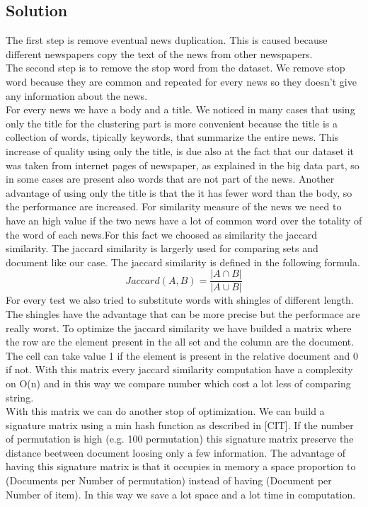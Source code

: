 \documentclass{acm_proc_article-sp}
\begin{document}
\subsection{Solution}
The first step is remove eventual news duplication. This is caused because different newspapers copy the text of the news from other newspapers.\\
The second step is to remove the stop word from the dataset. We remove stop word because they are common and repeated for every news so they doesn't give any information about the news.\\
For every news we have a body and a title. We noticed in many cases that using only the title for the clustering part is more convenient because the title is a collection of words, tipically keywords, that summarize the entire news. This increase of quality using only the title, is due also at the fact that our dataset it was taken from internet pages of newspaper, as explained in the big data part, so in some cases are present also words that are not part of the news. Another advantage of using only the title is that the it has fewer word than the body, so the performance are increased. 
For similarity measure of the news we need to have an high value if the two news have a lot of common word over the totality of the word of each news.For this fact we choosed as similarity the jaccard similarity. The jaccard similarity is largerly used for comparing sets and document like our case. The jaccard similarity is defined in the following formula.$$Jaccard(A,B) = \frac{\left\vert A \cap B \right\vert}{\left\vert A \cup B \right\vert}$$
For every test we also tried to substitute words with shingles of different length. The shingles have the advantage that can be more precise but the performace are really worst.
To optimize the jaccard similarity we have builded a matrix where the row are the element present in the all set and the column are the document. The cell can take value 1 if the element is present in the relative document and 0 if not. With this matrix every jaccard similarity computation have a complexity on O(n) and in this way we compare number which cost a lot less of comparing string. \\
With this matrix we can do another stop of optimization. We can build a signature matrix using a min hash function as described in [CIT]. If the number of permutation is high (e.g. 100 permutation) this signature matrix preserve the distance beetween document loosing only a few information. The advantage of having this signature matrix is that it occupies in memory a space proportion to (Documents per Number of permutation) instead of having (Document per Number of item). In this way we save a lot space and a lot time in computation.
\end{document}
